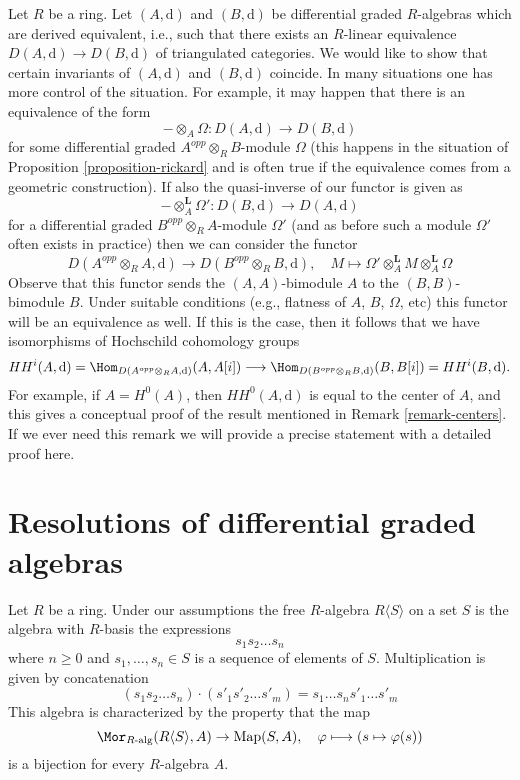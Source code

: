 \begin{remark}
\label{remark-hochschild-cohomology}
Let $R$ be a ring. Let $(A, \text{d})$ and $(B, \text{d})$ be differential
graded $R$-algebras which are derived equivalent, i.e., such that there
exists an $R$-linear equivalence $D(A, \text{d}) \to D(B, \text{d})$
of triangulated categories. We would like to show that certain invariants
of $(A, \text{d})$ and $(B, \text{d})$ coincide. In many situations
one has more control of the situation. For example, it may happen
that there is an equivalence of the form
$$
- \otimes_A \Omega : D(A, \text{d}) \longrightarrow D(B, \text{d})
$$
for some differential graded $A^{opp}\otimes_R B$-module
$\Omega$ (this happens in the situation of
Proposition \ref{proposition-rickard} and is often true
if the equivalence comes from a geometric construction).
If also the quasi-inverse of our functor is given as
$$
- \otimes_A^\mathbf{L} \Omega' : D(B, \text{d}) \longrightarrow D(A, \text{d})
$$
for a differential graded $B^{opp}\otimes_R A$-module $\Omega'$
(and as before such a module $\Omega'$ often exists in practice)
then we can consider the functor
$$
D(A^{opp} \otimes_R A, \text{d})
\longrightarrow
D(B^{opp} \otimes_R B, \text{d}),\quad
M \longmapsto \Omega' \otimes^\mathbf{L}_A M \otimes_A^\mathbf{L} \Omega
$$
Observe that this functor sends the $(A, A)$-bimodule $A$ to
the $(B, B)$-bimodule $B$. Under suitable conditions
(e.g., flatness of $A$, $B$, $\Omega$, etc)
this functor will be an equivalence as well.
If this is the case, then it follows that we have isomorphisms
of Hochschild cohomology groups
$$
HH^i(A, \text{d}) =
\Hom_{D(A^{opp} \otimes_R A, \text{d})}(A, A[i])
\longrightarrow
\Hom_{D(B^{opp} \otimes_R B, \text{d})}(B, B[i]) =
HH^i(B, \text{d}).
$$
For example, if $A = H^0(A)$, then $HH^0(A, \text{d})$
is equal to the center of $A$, and this gives a conceptual proof
of the result mentioned in Remark \ref{remark-centers}.
If we ever need this remark we will provide a precise statement
with a detailed proof here.
\end{remark}



\section{Resolutions of differential graded algebras}
\label{section-resolution-dgas}

\noindent
Let $R$ be a ring. Under our assumptions the free $R$-algebra
$R\langle S \rangle$ on a set $S$ is the algebra with $R$-basis
the expressions
$$
s_1 s_2 \ldots s_n
$$
where $n \geq 0$ and $s_1, \ldots, s_n \in S$ is a sequence of
elements of $S$. Multiplication is given by concatenation
$$
(s_1 s_2 \ldots s_n) \cdot (s'_1 s'_2 \ldots s'_m) =
s_1 \ldots s_n s'_1 \ldots s'_m
$$
This algebra is characterized by the property that the map
$$
\Mor_{R\text{-alg}}(R\langle S \rangle, A) \to
\text{Map}(S, A),\quad
\varphi \longmapsto (s \mapsto \varphi(s))
$$
is a bijection for every $R$-algebra $A$.

